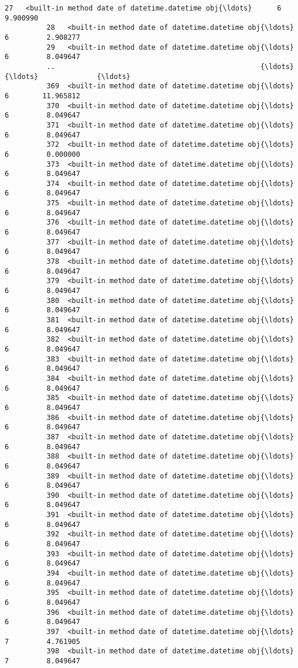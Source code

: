 \documentclass[11pt]{article}
\begin{document}
\begin{Verbatim}[commandchars=\\\{\}]
          27   <built-in method date of datetime.datetime obj{\ldots}      6         9.900990  
          28   <built-in method date of datetime.datetime obj{\ldots}      6         2.908277  
          29   <built-in method date of datetime.datetime obj{\ldots}      6         8.049647  
          ..                                                 {\ldots}    {\ldots}              {\ldots}  
          369  <built-in method date of datetime.datetime obj{\ldots}      6        11.965812  
          370  <built-in method date of datetime.datetime obj{\ldots}      6         8.049647  
          371  <built-in method date of datetime.datetime obj{\ldots}      6         8.049647  
          372  <built-in method date of datetime.datetime obj{\ldots}      6         0.000000  
          373  <built-in method date of datetime.datetime obj{\ldots}      6         8.049647  
          374  <built-in method date of datetime.datetime obj{\ldots}      6         8.049647  
          375  <built-in method date of datetime.datetime obj{\ldots}      6         8.049647  
          376  <built-in method date of datetime.datetime obj{\ldots}      6         8.049647  
          377  <built-in method date of datetime.datetime obj{\ldots}      6         8.049647  
          378  <built-in method date of datetime.datetime obj{\ldots}      6         8.049647  
          379  <built-in method date of datetime.datetime obj{\ldots}      6         8.049647  
          380  <built-in method date of datetime.datetime obj{\ldots}      6         8.049647  
          381  <built-in method date of datetime.datetime obj{\ldots}      6         8.049647  
          382  <built-in method date of datetime.datetime obj{\ldots}      6         8.049647  
          383  <built-in method date of datetime.datetime obj{\ldots}      6         8.049647  
          384  <built-in method date of datetime.datetime obj{\ldots}      6         8.049647  
          385  <built-in method date of datetime.datetime obj{\ldots}      6         8.049647  
          386  <built-in method date of datetime.datetime obj{\ldots}      6         8.049647  
          387  <built-in method date of datetime.datetime obj{\ldots}      6         8.049647  
          388  <built-in method date of datetime.datetime obj{\ldots}      6         8.049647  
          389  <built-in method date of datetime.datetime obj{\ldots}      6         8.049647  
          390  <built-in method date of datetime.datetime obj{\ldots}      6         8.049647  
          391  <built-in method date of datetime.datetime obj{\ldots}      6         8.049647  
          392  <built-in method date of datetime.datetime obj{\ldots}      6         8.049647  
          393  <built-in method date of datetime.datetime obj{\ldots}      6         8.049647  
          394  <built-in method date of datetime.datetime obj{\ldots}      6         8.049647  
          395  <built-in method date of datetime.datetime obj{\ldots}      6         8.049647  
          396  <built-in method date of datetime.datetime obj{\ldots}      6         8.049647  
          397  <built-in method date of datetime.datetime obj{\ldots}      7         4.761905  
          398  <built-in method date of datetime.datetime obj{\ldots}      7         8.049647  
          

\end{Verbatim}
\end{document}
